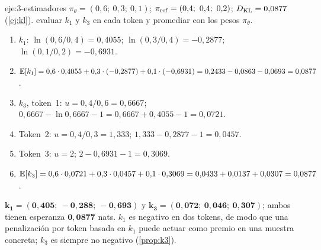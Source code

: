 \begin{solucion}{eje:3-estimadores}
\datos $\pi_\theta=(0{,}6;\ 0{,}3;\ 0{,}1)$; $\pi_{\mathrm{ref}}=(0{,}4;\ 0{,}4;\ 0{,}2)$; $D_{\mathrm{KL}}=0{,}0877$ (\cref{ej:kl}).
\planteamiento evaluar $k_1$ y $k_3$ en cada token y promediar con los pesos $\pi_\theta$.
\pasos
\begin{enumerate}[label=\arabic*.]
  \item $k_1$: $\ln(0{,}6/0{,}4)=0{,}4055$; $\ln(0{,}3/0{,}4)=-0{,}2877$; $\ln(0{,}1/0{,}2)=-0{,}6931$.
  \item $\mathbb{E}[k_1]=0{,}6\cdot 0{,}4055+0{,}3\cdot(-0{,}2877)+0{,}1\cdot(-0{,}6931)=0{,}2433-0{,}0863-0{,}0693=0{,}0877$.
  \item $k_3$, token~1: $u=0{,}4/0{,}6=0{,}6667$; $0{,}6667-\ln 0{,}6667-1=0{,}6667+0{,}4055-1=0{,}0721$.
  \item Token~2: $u=0{,}4/0{,}3=1{,}333$; $1{,}333-0{,}2877-1=0{,}0457$.
  \item Token~3: $u=2$; $2-0{,}6931-1=0{,}3069$.
  \item $\mathbb{E}[k_3]=0{,}6\cdot 0{,}0721+0{,}3\cdot 0{,}0457+0{,}1\cdot 0{,}3069=0{,}0433+0{,}0137+0{,}0307=0{,}0877$.
\end{enumerate}
\resultado $\mathbf{k_1=(0{,}405;\ -0{,}288;\ -0{,}693)}$ y $\mathbf{k_3=(0{,}072;\ 0{,}046;\ 0{,}307)}$; ambos tienen esperanza $\mathbf{0{,}0877}$ nats.
\comprobacion $k_1$ es negativo en dos tokens, de modo que una penalización por token basada en $k_1$ puede actuar como premio en una muestra concreta; $k_3$ es siempre no negativo (\cref{prop:k3}).
\end{solucion}

